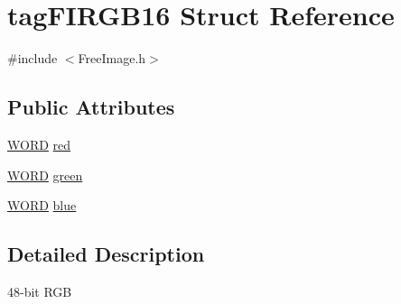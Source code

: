 \hypertarget{structtag_f_i_r_g_b16}{\section{tag\-F\-I\-R\-G\-B16 Struct Reference}
\label{structtag_f_i_r_g_b16}
}


{\ttfamily \#include $<$Free\-Image.\-h$>$}

\subsection*{Public Attributes}
\begin{DoxyCompactItemize}
\item 
\hyperlink{_free_image_8h_ab24077addd3b7b13e086987ff296552c}{W\-O\-R\-D} \hyperlink{structtag_f_i_r_g_b16_aeaa2393246d6482c02cac30d169ee022}{red}
\item 
\hyperlink{_free_image_8h_ab24077addd3b7b13e086987ff296552c}{W\-O\-R\-D} \hyperlink{structtag_f_i_r_g_b16_a00e213246943f0a47698fdd0d51f9924}{green}
\item 
\hyperlink{_free_image_8h_ab24077addd3b7b13e086987ff296552c}{W\-O\-R\-D} \hyperlink{structtag_f_i_r_g_b16_ae9de217a4d3c01c533bc8e727c0ec0eb}{blue}
\end{DoxyCompactItemize}


\subsection{Detailed Description}
48-\/bit R\-G\-B 


